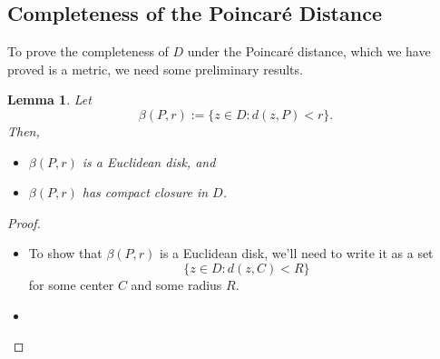 \documentclass[10pt]{article}
\theoremstyle{plain}
\newtheorem{lemma}{Lemma}
\begin{document}
\subsection*{Completeness of the Poincaré Distance}
	To prove the completeness of $D$ under the Poincaré distance, which we have proved is a metric, we need some preliminary results.
		\begin{lemma} Let $$\beta(P, r) := \{z \in D : d(z, P) < r\}.$$ Then,
			\begin{itemize}
				\item[(1)] $\beta(P, r)$ is a Euclidean disk, and
				
				\item[(2)] $\beta(P, r)$ has compact closure in $D$. 
 			\end{itemize}
		\end{lemma}
		\begin{proof} ~
			\begin{itemize}
				\item[(1)] To show that $\beta(P, r)$ is a Euclidean disk, we'll need to write it as a set $$\{z \in D : d(z, C) < R\}$$ for some center $C$ and some radius $R$.  
				
				\item[(2)] 
			\end{itemize}
		\end{proof}
		
\end{document}
